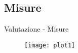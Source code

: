 \subsection{Misure}
\begin{frame}{Valutazione - Misure}
	\begin{figure}
	\texttt{[image: plot1]}
	\end{figure}
	
\end{frame}